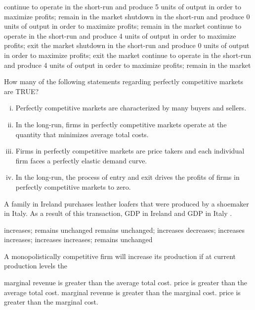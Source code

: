 \documentclass[addpoints,11pt]{exam}
\theoremstyle{definition}
\newcommand{\blank}[0]{\underline{\hspace{3cm}}}
\begin{document}
\begin{questions}
\begin{choices}
	\choice continue to operate in the short-run and produce 5 units of output in order to maximize profits; remain in the market
	\choice shutdown in the short-run and produce 0 units of output in order to maximize profits; remain in the market
	\choice continue to operate in the short-run and produce 4 units of output in order to maximize profits; exit the market
	\CorrectChoice shutdown in the short-run and produce 0 units of output in order to maximize profits; exit the market
	\choice continue to operate in the short-run and produce 4 units of output in order to maximize profits; remain in the market
\end{choices}


\question How many of the following statements regarding perfectly competitive markets are TRUE?

\begin{enumerate}[i.]
	\item Perfectly competitive markets are characterized by many buyers and sellers.
	\item In the long-run, firms in perfectly competitive markets operate at the quantity that minimizes average total costs.
	\item Firms in perfectly competitive markets are price takers and each individual firm faces a perfectly elastic demand curve.
	\item In the long-run, the process of entry and exit drives the profits of firms in perfectly competitive markets to zero.
\end{enumerate}

\begin{choices}
\end{choices}

	\question A family in Ireland purchases leather loafers that were produced by a shoemaker in Italy. As a result of this transaction, GDP in Ireland \blank and GDP in Italy \blank. 

\begin{choices}
	\choice increases; remains unchanged
	\CorrectChoice remains unchanged; increases
	\choice decreases; increases
	\choice increases; increases
	\choice increases; remains unchanged
\end{choices}

\question A monopolistically competitive firm will increase its production if at current production levels the 

\begin{choices}
	\choice marginal revenue is greater than the average total cost.
	\choice price is greater than the average total cost.
	\CorrectChoice marginal revenue is greater than the marginal cost.
	\choice price is greater than the marginal cost.
\end{choices}



\end{questions}
\end{document}
